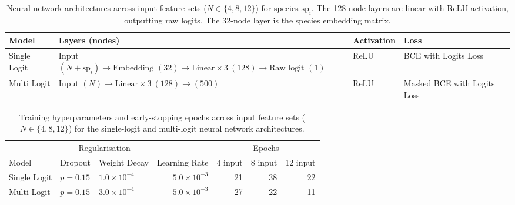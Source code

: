 \documentclass{article}
\begin{document}
\begin{table}[ht]
    \centering
    \small
    \setlength{\tabcolsep}{4pt}
    \begin{tabularx}{\linewidth}{@{} l >{\raggedright\arraybackslash}X l >{\raggedright\arraybackslash}X @{}}
        \toprule
        Model & Layers (nodes) & Activation & Loss \\
        \midrule
        Single Logit & Input $(N + \text{sp}_i) \rightarrow \text{Embedding } (32) \rightarrow \text{Linear} \times 3\ (128) \rightarrow \text{Raw logit } (1)$ & ReLU & BCE with Logits Loss \\
        \addlinespace[3pt]
        Multi Logit & Input $(N) \rightarrow \text{Linear} \times 3\ (128) \rightarrow (500)$ & ReLU & Masked BCE with Logits Loss \\
        \bottomrule
    \end{tabularx}
    \caption{Neural network architectures across input feature sets ($N \in \{4, 8, 12\}$) for species $\text{sp}_i$. The 128-node layers are linear with ReLU activation, outputting raw logits. The 32-node layer is the species embedding matrix.}
    \label{tab:nn_arch}
\end{table}

\begin{table}[ht]
    \centering
    \small
    \begin{tabular*}{\linewidth}{@{\extracolsep{\fill}} lllrrrr @{}}
        \toprule
        & \multicolumn{2}{c}{Regularisation} & & \multicolumn{3}{c}{Epochs} \\
        \cmidrule(lr){2-3} \cmidrule(l){5-7}
        Model & Dropout & Weight Decay & Learning Rate & 4 input & 8 input & 12 input \\
        \midrule
        Single Logit & $p = 0.15$ & $1.0 \times 10^{-4}$ & $5.0 \times 10^{-3}$ & 21 & 38 & 22 \\
        Multi Logit & $p = 0.15$ & $3.0 \times 10^{-4}$ & $5.0 \times 10^{-3}$ & 27 & 22 & 11 \\
        \bottomrule
    \end{tabular*}
    \caption{Training hyperparameters and early-stopping epochs across input feature sets ($N \in \{4, 8, 12\}$) for the single-logit and multi-logit neural network architectures.}
    \label{tab:nn_hyperparams}
\end{table}
\end{document}
